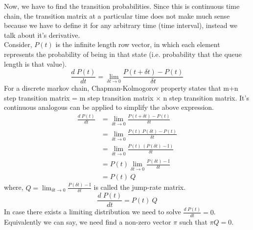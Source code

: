 \documentclass{article}
\theoremstyle{remark}
\begin{document}
Now, we have to find the transition probabilities. Since this is continuous time chain, the transition matrix at a particular time does not make much sense because we have to define it for any arbitrary time (time interval), instead we talk about it's derivative.\\
\newline
Consider, $P(t)$ is the infinite length row vector, in which each element represents the probability of being in that state (i.e. probability that the queue length is that value).
\[
    \frac{d\;P(t)}{dt}  = \lim_{{\delta t} \to 0} \frac{P(t+\delta t)-P(t)}{\delta t}
\]
For a discrete markov chain, Chapman-Kolmogorov property states that m+n step transition matrix = m step transition matrix $\times$ n step transition matrix. It's continuous analogous can be applied to simplify the above expression.
\begin{align*}
    \frac{d\;P(t)}{dt}  &= \lim_{{\delta t} \to 0} \frac{P(t+\delta t)-P(t)}{\delta t}\\
    &= \lim_{{\delta t} \to 0} \frac{P(t)\:P(\delta t)-P(t)}{\delta t}\\
    &= \lim_{{\delta t} \to 0} \frac{P(t)\:(P(\delta t)-\mathbb{I})}{\delta t}\\
    &= P(t) \lim_{{\delta t} \to 0} \frac{P(\delta t)-\mathbb{I}}{\delta t}\\
    &= P(t)\:Q
\end{align*}
where, $Q=\lim_{{\delta t} \to 0}\frac{P(\delta t)-\mathbb{I}}{\delta t}$ is called the jump-rate matrix.
\[
    \frac{d\;P(t)}{dt} = P(t)\:Q
\]
In case there exists a limiting distribution we need to solve $\frac{d\;P(t)}{dt}=0$. Equivalently we can say, we need find a non-zero vector $\pi$ such that $\pi Q = 0$.
\end{document}

